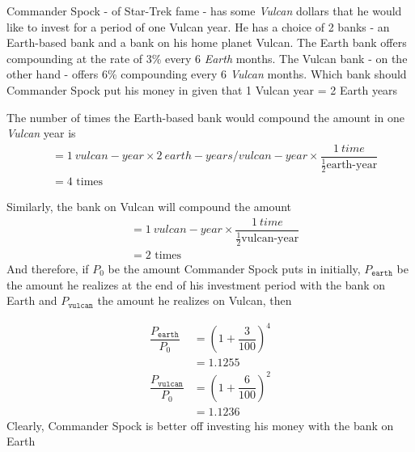

\question[4]   Commander Spock - of Star-Trek fame - has some \textit{Vulcan} dollars that he
would like to invest for a period of one Vulcan year. He has a choice of 2 banks - an Earth-based
bank and a bank on his home planet Vulcan. The Earth bank offers compounding at the
rate of 3\% every 6 \textit{Earth} months. The Vulcan bank - on the other hand - offers 6\% compounding
every 6 \textit{Vulcan} months. Which bank should Commander Spock put his money in given that
1 Vulcan year = 2 Earth years


\ifprintanswers
\fi 

\begin{solution}[\fullpage]
	The number of times the Earth-based bank would compound the amount in one \textit{Vulcan}
	year is 
	\begin{align}
		&= \SI{1}{vulcan-year}\times\SI{2}{earth-years\per vulcan-year}\times
		\dfrac{\SI{1}{time}}{\frac{1}{2}\text{earth-year}} \\
		&= 4\text{ times}
	\end{align}
	
	Similarly, the bank on Vulcan will compound the amount
	\begin{align}
		&= \SI{1}{vulcan-year}\times\dfrac{\SI{1}{time}}{\frac{1}{2}\text{vulcan-year}} \\
		&= 2\text{ times}
	\end{align}
	And therefore, if $P_0$ be the amount Commander Spock puts in initially, 
	$P_{\texttt{earth}}$ be the amount he realizes at the end of his investment period with the bank
	on Earth and $P_{\texttt{vulcan}}$ the amount he realizes on Vulcan, then 
	
	\begin{align}
		\dfrac{P_\texttt{earth}}{P_0} &= \left( 1 + \dfrac{3}{100}\right)^4 \\
		                       &= 1.1255 \\
		\dfrac{P_\texttt{vulcan}}{P_0} &= \left( 1 + \dfrac{6}{100}\right)^2 \\
		                        &= 1.1236
	\end{align}
	Clearly, Commander Spock is better off investing his
	money with the bank on Earth
\end{solution}
